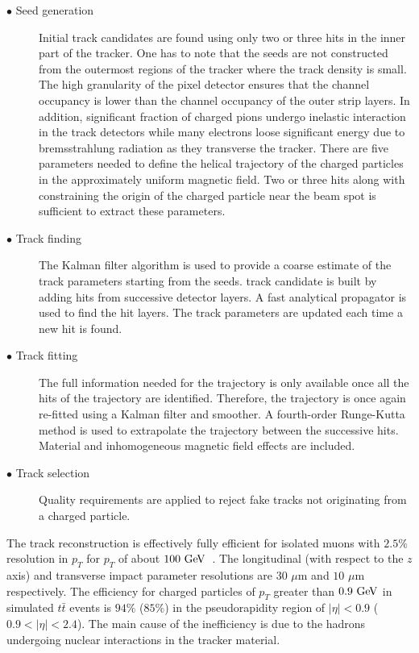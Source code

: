 \begin{description}
\item[$\bullet$ Seed generation]  Initial track candidates are found using only two or three hits in the inner part of the tracker. One has to note that the seeds are not constructed from the outermost regions of the tracker where the track density is small. The high granularity of the pixel detector ensures that the channel occupancy is lower than the channel occupancy of the outer strip layers. In addition, significant fraction of charged pions undergo inelastic interaction in the track detectors while many electrons loose significant energy due to bremsstrahlung radiation as they transverse the tracker. There are five parameters needed to define the helical trajectory of the charged particles in the approximately uniform magnetic field. Two or three hits along with constraining the origin of the charged particle near the beam spot is sufficient to extract these parameters.
\item[$\bullet$ Track finding]  The Kalman filter algorithm is used to provide a coarse estimate of the track parameters starting from the seeds.  track candidate is built by adding hits from successive detector layers. A fast analytical propagator is used to find the hit layers. The track parameters are updated each time a new hit is found.
\item[$\bullet$ Track fitting] The full information needed for the trajectory is only available once all the hits of the trajectory are identified. Therefore, the trajectory is once again re-fitted using a Kalman filter and smoother. A fourth-order Runge-Kutta method is used to extrapolate the trajectory between the successive hits. Material and inhomogeneous magnetic field effects are included.
\item[$\bullet$ Track selection] Quality requirements are applied to reject fake tracks not originating from a charged particle. 
\end{description}

The track reconstruction is effectively fully efficient for isolated muons with $2.5\%$ resolution in $p_{T}$ for $p_{T}$ of about $100~\mathrm{Ge\kern -0.1em V}$~\cite{Chatrchyan:2014fea}. The longitudinal (with respect to the $z$ axis) and transverse impact parameter resolutions are $30$ $\mu$m and $10$ $\mu$m respectively. The efficiency for charged particles of $p_{T}$ greater than $0.9~\mathrm{Ge\kern -0.1em V}$ in simulated $t\bar{t}$ events is $94\%$ ($85\%$) in the pseudorapidity region of $|\eta|<0.9$ ($0.9<|\eta|<2.4$). The main cause of the inefficiency is due to the hadrons undergoing nuclear interactions in the tracker material.   

